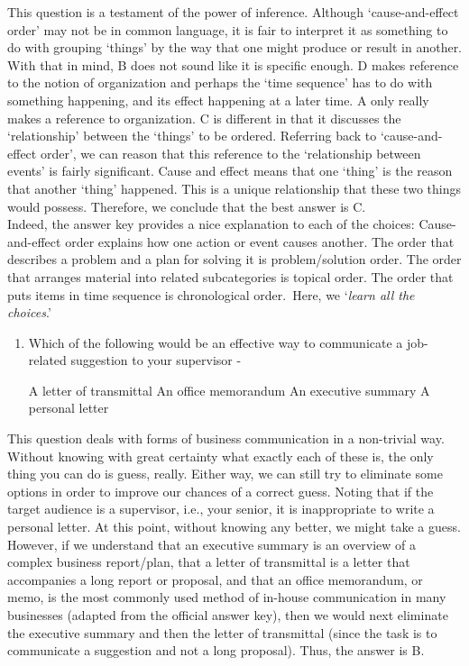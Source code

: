 \documentclass[12pt]{article}
\newcounter{choice}
\renewcommand\thechoice{\Alph{choice}}
\newcommand\choicelabel{\thechoice.}
\newenvironment{choices}%
  {\list{\choicelabel}%
     {\usecounter{choice}\def\makelabel##1{\hss\llap{##1}}%
       \settowidth{\leftmargin}{W.\hskip\labelsep\hskip 2.5em}%
       \def\choice{%
         \item
       } %
       \labelwidth\leftmargin\advance\labelwidth-\labelsep
       \topsep=0pt
       \partopsep=0pt
     }%
  }%
  {\endlist}
\begin{document}
	This question is a testament of the power of inference. Although \lq cause-and-effect order' may not be in common language, it is fair to interpret it as something to do with grouping \lq things' by the way that one might produce or result in another. With that in mind, B does not sound like it is specific enough. D makes reference to the notion of organization and perhaps the \lq time sequence' has to do with something happening, and its effect happening at a later time. A only really makes a reference to organization. C is different in that it discusses the \lq relationship' between the \lq things' to be ordered. Referring back to \lq cause-and-effect order', we can reason that this reference to the \lq relationship between events' is fairly significant. Cause and effect means that one \lq thing' is the reason that another \lq thing' happened. This is a unique relationship that these two things would possess. Therefore, we conclude that the best answer is C. \\  
	
	Indeed, the answer key provides a nice explanation to each of the choices: \ldq Cause-and-effect order explains how one action or event causes another. The order that describes a problem and a plan for solving it is problem/solution order. The order that arranges material into related subcategories is topical order. The order that puts items in time sequence is chronological order.\rdq  \ Here, we \lq \textit{learn all the choices}.'


\begin{enumerate}[resume]
	\item Which of the following would be an effective way to communicate a job-related suggestion to your supervisor
	\begin{choices}
		\choice A letter of transmittal
		\choice An office memorandum
		\choice An executive summary
		\choice A personal letter
	\end{choices}
\end{enumerate}

	This question deals with forms of business communication in a non-trivial way. Without knowing with great certainty what exactly each of these is, the only thing you can do is guess, really. Either way, we can still try to eliminate some options in order to improve our chances of a correct guess. Noting that if the target audience is a supervisor, i.e., your senior, it is inappropriate to write a personal letter. At this point, without knowing any better, we might take a guess. However, if we understand that an executive summary is an overview of a complex business report/plan, that a letter of transmittal is a letter that accompanies a long report or proposal, and that an office memorandum, or memo, is the most commonly used method of in-house communication in many businesses (adapted from the official answer key), then we would next eliminate the executive summary and then the letter of transmittal (since the task is to communicate a suggestion and not a long proposal). Thus, the answer is B.
\end{document}
